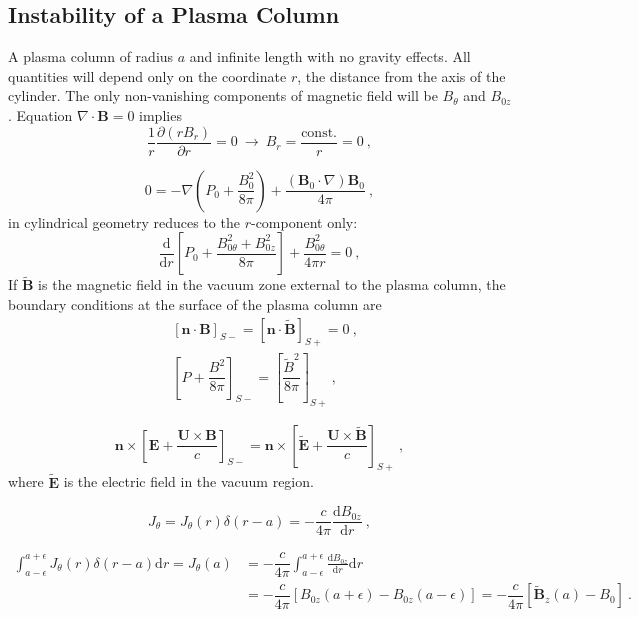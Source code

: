 \documentclass[12pt,a4paper]{article}
\renewcommand{\vec}[1]{\boldsymbol{#1}}
\newcommand{\dif}{\mathrm{d}}
\begin{document}
\subsection{Instability of a Plasma Column}
A plasma column of radius $a$ and infinite length with no gravity effects. All quantities will depend only on the coordinate $r$, the distance from the axis of the cylinder. The only non-vanishing components of magnetic field will be $B_\theta$ and $B_{0z}$. Equation $\nabla \cdot \vec{B} = 0$ implies
\begin{equation}
\frac{1}{r} \frac{\partial (rB_r) }{\partial r} = 0 ~\rightarrow ~ B_r = \dfrac{\text{const.}}{r} = 0 ~,
\end{equation}

\begin{equation*}
0 = -\nabla \left(P_0 +\dfrac{B_0^2}{8\pi} \right) +\frac{(\vec{B}_0 \cdot \nabla)\vec{B}_0}{4\pi} ~,
\end{equation*}
in cylindrical geometry reduces to the $r$-component only:
\begin{equation}
\frac{\dif}{\dif r} \left[P_0 +\dfrac{B_{0\theta}^2+B_{0z}^2}{8\pi} \right] +\dfrac{B_{0\theta}^2}{4\pi r} = 0 ~,
\end{equation}
If $\tilde{\vec{B}}$ is the magnetic field in the vacuum zone external to the plasma column, the boundary conditions at the surface of the plasma column are
\begin{align}
& [\vec{n}\cdot \vec{B} ]_{S-} = [\vec{n}\cdot \tilde{\vec{B}} ]_{S+} = 0 ~, \\
& \left[P +\dfrac{B^2}{8\pi} \right]_{S-} = \left[\dfrac{\tilde{B}^2}{8\pi} \right]_{S+} ~,
\end{align}

\begin{equation}
\vec{n} \times \left[\vec{E} +\dfrac{\vec{U} \times \vec{B} }{c} \right]_{S-} = \vec{n} \times \left[\tilde{\vec{E}} +\dfrac{\vec{U} \times \tilde{\vec{B}} }{c} \right]_{S+} ~,
\end{equation}
where $\tilde{\vec{E}}$ is the electric field in the vacuum region.

\begin{equation*}
J_\theta = J_\theta(r) \delta(r-a) = -\dfrac{c}{4\pi} \frac{\dif B_{0z} }{\dif r} ~,
\end{equation*}

\begin{align*}
\int_{a-\epsilon}^{a+\epsilon} J_\theta(r) \delta(r-a) \dif r = J_\theta(a) &= -\dfrac{c}{4\pi} \int_{a-\epsilon}^{a+\epsilon}  \frac{\dif B_{0z} }{\dif r}  \dif r \\
&= -\dfrac{c}{4\pi} [B_{0z}(a+\epsilon) -B_{0z}(a-\epsilon)] = -\dfrac{c}{4\pi} [\tilde{\vec{B}}_z(a) -B_0] ~.
\end{align*}
\end{document}
